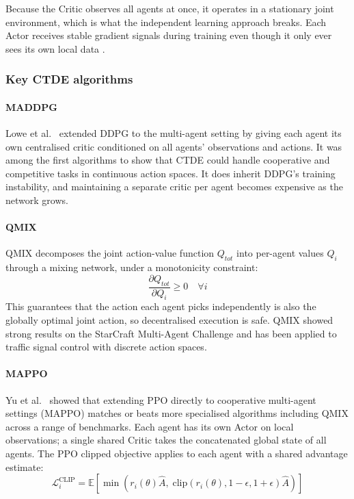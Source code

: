 ﻿\documentclass[11pt, a4paper]{report}
\begin{document}
Because the Critic observes all agents at once, it operates in a stationary joint environment, which is what the independent learning approach breaks. Each Actor receives stable gradient signals during training even though it only ever sees its own local data \cite{lowe2017multi}.

\subsubsection{Key CTDE algorithms}

\paragraph{MADDPG}

Lowe et al.\ \cite{lowe2017multi} extended DDPG to the multi-agent setting by giving each agent its own centralised critic conditioned on all agents' observations and actions. It was among the first algorithms to show that CTDE could handle cooperative and competitive tasks in continuous action spaces. It does inherit DDPG's training instability, and maintaining a separate critic per agent becomes expensive as the network grows.

\paragraph{QMIX}

QMIX \cite{rashid2018qmix} decomposes the joint action-value function $Q_{tot}$ into per-agent values $Q_i$ through a mixing network, under a monotonicity constraint:
\begin{equation}
\frac{\partial Q_{tot}}{\partial Q_i} \geq 0 \quad \forall i
\label{eq:qmix_monotone}
\end{equation}
This guarantees that the action each agent picks independently is also the globally optimal joint action, so decentralised execution is safe. QMIX showed strong results on the StarCraft Multi-Agent Challenge \cite{samvelyan2019starcraft} and has been applied to traffic signal control with discrete action spaces.

\paragraph{MAPPO}

Yu et al.\ \cite{yu2022surprising} showed that extending PPO directly to cooperative multi-agent settings (MAPPO) matches or beats more specialised algorithms including QMIX across a range of benchmarks. Each agent has its own Actor on local observations; a single shared Critic takes the concatenated global state of all agents. The PPO clipped objective applies to each agent with a shared advantage estimate:
\begin{equation}
\mathcal{L}^{\text{CLIP}}_i = \mathbb{E}\left[\min\left(r_i(\theta)\hat{A}, \;\text{clip}(r_i(\theta), 1-\epsilon, 1+\epsilon)\hat{A}\right)\right]
\label{eq:mappo_clip}
\end{equation}
\end{document}
